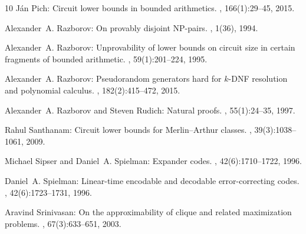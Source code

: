 \documentclass[11pt]{article}
\numberwithin{equation}{section}
\theoremstyle{definition}
\theoremstyle{plain}
\begin{document}
\begin{thebibliography}{10}
{\sc J\'an Pich}: Circuit lower bounds in bounded arithmetics.
, 166(1):29--45, 2015.

{\sc Alexander~A. Razborov}: On provably disjoint {NP}-pairs.
, 1(36), 1994.

{\sc Alexander~A. Razborov}: Unprovability of lower bounds on circuit size in
  certain fragments of bounded arithmetic.
,
  59(1):201--224, 1995.

{\sc Alexander~A. Razborov}: Pseudorandom generators hard for $k$-{DNF}
  resolution and polynomial calculus.
, 182(2):415--472, 2015.

{\sc Alexander~A. Razborov and Steven Rudich}: Natural proofs.
, 55(1):24--35, 1997.

{\sc Rahul Santhanam}: Circuit lower bounds for {M}erlin--{A}rthur classes.
, 39(3):1038--1061, 2009.
\newblock [\epfmtdoi{10.1137/070702680}]

{\sc Michael Sipser and Daniel~A. Spielman}: Expander codes.
, 42(6):1710--1722, 1996.
\newblock [\epfmtdoi{10.1109/18.556667}]

{\sc Daniel~A. Spielman}: Linear-time encodable and decodable error-correcting
  codes.
, 42(6):1723--1731, 1996.
\newblock [\epfmtdoi{10.1109/18.556668}]

{\sc Aravind Srinivasan}: On the approximability of clique and related
  maximization problems.
, 67(3):633--651, 2003.
\newblock [\epfmtdoi{10.1016/S0022-0000(03)00110-7}]


\end{thebibliography}
\end{document}
